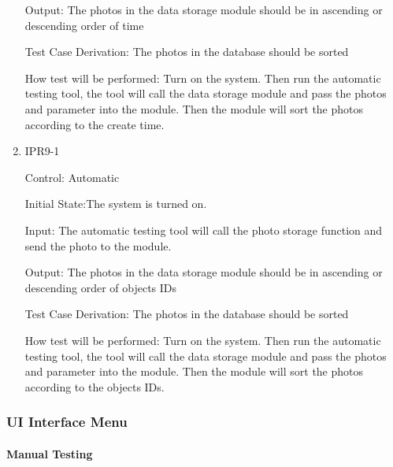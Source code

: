 \documentclass[12pt, titlepage]{article}
\begin{document}
\begin{enumerate}
Output: The photos in the data storage module should be in ascending or descending order of time

Test Case Derivation: The photos in the database should be sorted
					
How test will be performed:
Turn on the system. Then run the automatic testing tool, the tool will call the data storage module and pass the photos and parameter into the module. Then the module will sort the photos according to the create time.


\item{IPR9-1\\}

Control: Automatic
					
Initial State:The system is turned on.
					
Input: The automatic testing tool will call the photo storage function and send the photo to the module. 
					
Output: The photos in the data storage module should be in ascending or descending order of objects IDs

Test Case Derivation: The photos in the database should be sorted
					
How test will be performed:
Turn on the system. Then run the automatic testing tool, the tool will call the data storage module and pass the photos and parameter into the module. Then the module will sort the photos according to the objects IDs.


				

\end{enumerate}


\subsubsection{UI Interface Menu}


\paragraph{Manual Testing}
\end{document}
